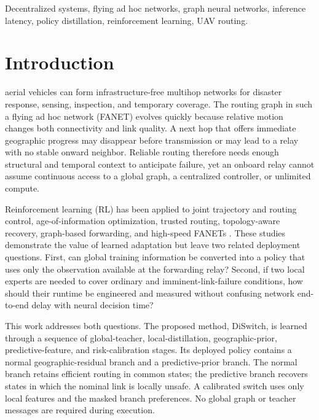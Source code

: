 \documentclass{ieeeaccess}
\newcommand{\DS}{DiSwitch}
\begin{document}
\begin{keywords}
Decentralized systems, flying ad hoc networks, graph neural networks, inference latency, policy distillation, reinforcement learning, UAV routing.
\end{keywords}

\titlepgskip=-21pt
\maketitle

\section{Introduction}

 aerial vehicles can form infrastructure-free multihop networks for disaster response, sensing, inspection, and temporary coverage. The routing graph in such a flying ad hoc network (FANET) evolves quickly because relative motion changes both connectivity and link quality. A next hop that offers immediate geographic progress may disappear before transmission or may lead to a relay with no stable onward neighbor. Reliable routing therefore needs enough structural and temporal context to anticipate failure, yet an onboard relay cannot assume continuous access to a global graph, a centralized controller, or unlimited compute.

Reinforcement learning (RL) has been applied to joint trajectory and routing control, age-of-information optimization, trusted routing, topology-aware recovery, graph-based forwarding, and high-speed FANETs \cite{alam2024joint,wu2026aoi,jia2025trusted,cui2022tarraq,zhang2025gat,shou2026adaptive}. These studies demonstrate the value of learned adaptation but leave two related deployment questions. First, can global training information be converted into a policy that uses only the observation available at the forwarding relay? Second, if two local experts are needed to cover ordinary and imminent-link-failure conditions, how should their runtime be engineered and measured without confusing network end-to-end delay with neural decision time?

This work addresses both questions. The proposed method, \DS{}, is learned through a sequence of global-teacher, local-distillation, geographic-prior, predictive-feature, and risk-calibration stages. Its deployed policy contains a normal geographic-residual branch and a predictive-prior branch. The normal branch retains efficient routing in common states; the predictive branch recovers states in which the nominal link is locally unsafe. A calibrated switch uses only local features and the masked branch preferences. No global graph or teacher messages are required during execution.
\end{document}
